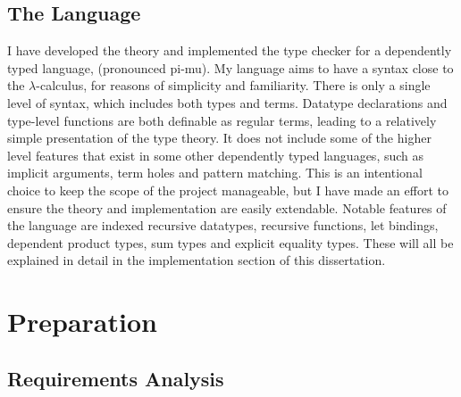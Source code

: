 \documentclass[12pt,a4paper,twoside]{report}
\begin{document}
\section{The \pimu{} Language}

I have developed the theory and implemented the type checker for a dependently typed language, \pimu{} (pronounced pi-mu).
My language aims to have a syntax close to the \(\lambda\)-calculus, for reasons of simplicity and familiarity.
There is only a single level of syntax, which includes both types and terms.
Datatype declarations and type-level functions are both definable as regular terms, leading to a relatively simple presentation of the type theory.
It does not include some of the higher level features that exist in some other dependently typed languages, such as implicit arguments, term holes and pattern matching.
This is an intentional choice to keep the scope of the project manageable, but I have made an effort to ensure the theory and implementation are easily extendable.
Notable features of the language are indexed recursive datatypes, recursive functions, let bindings, dependent product types, sum types and explicit equality types.
These will all be explained in detail in the implementation section of this dissertation.

\chapter{Preparation}

\section{Requirements Analysis}
\end{document}
